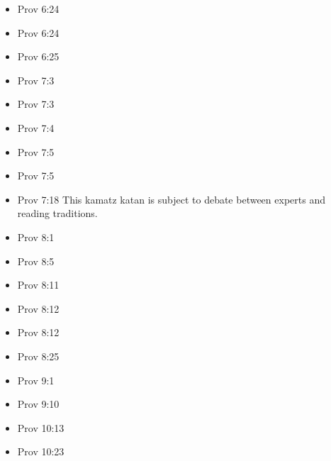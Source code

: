 \documentclass[14pt]{article}
\begin{document}
\begin{multicols}{2}
\begin{itemize}
									\item Prov 6:24
									
									\item Prov 6:24
									
									\item Prov 6:25
									
									\item Prov 7:3
									
									\item Prov 7:3
									
									\item Prov 7:4
									
									\item Prov 7:5
									
									\item Prov 7:5
									
									\item Prov 7:18 This kamatz katan is subject to debate between experts and reading traditions.
									
									\item Prov 8:1
									
									\item Prov 8:5
									
									\item Prov 8:11
									
									\item Prov 8:12
									
									\item Prov 8:12
									
									\item Prov 8:25
									
									\item Prov 9:1
									
									\item Prov 9:10
									
									\item Prov 10:13
									
									\item Prov 10:23
									

\end{itemize}
\end{multicols}
\end{document}
